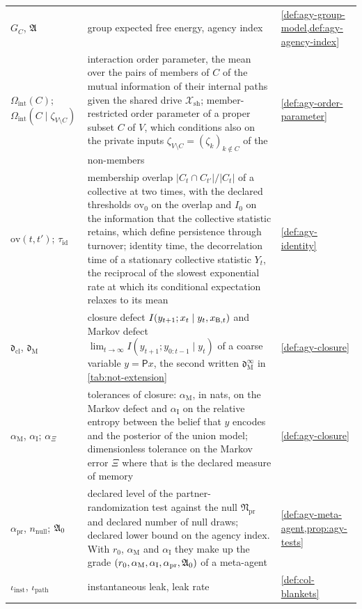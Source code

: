 \begin{longtable}{@{}>{\raggedright\arraybackslash}p{}>{\raggedright\arraybackslash}p{}>{\raggedright\arraybackslash}p{}@{}}
$G_C$, $\mathfrak{A}$ & group expected free energy, agency index & \cref{def:agy-group-model,def:agy-agency-index}\\
$\Omega_{\mathrm{int}}(C)$; $\Omega_{\mathrm{int}}(C\mid\zeta_{V\setminus C})$ & interaction order parameter, the mean over the pairs of members of $C$ of the mutual information of their internal paths given the shared drive $\mathcal X_{\mathrm{sh}}$; member-restricted order parameter of a proper subset $C$ of $V$, which conditions also on the private inputs $\zeta_{V\setminus C}=(\zeta_k)_{k\notin C}$ of the non-members & \cref{def:agy-order-parameter}\\
$\mathrm{ov}(t,t')$; $\tau_{\mathrm{id}}$ & membership overlap $\lvert C_t\cap C_{t'}\rvert/\lvert C_t\rvert$ of a collective at two times, with the declared thresholds $\mathrm{ov}_0$ on the overlap and $I_0$ on the information that the collective statistic retains, which define persistence through turnover; identity time, the decorrelation time of a stationary collective statistic $Y_t$, the reciprocal of the slowest exponential rate at which its conditional expectation relaxes to its mean & \cref{def:agy-identity}\\
$\mathfrak d_{\mathrm{cl}}$, $\mathfrak d_{\mathrm M}$ & closure defect $I(y_{t+1};x_t\mid y_t,x_{\mathsf{B},t})$ and Markov defect $\lim_{t\to\infty}I(y_{t+1};y_{0:t-1}\mid y_t)$ of a coarse variable $y=\mathsf Px$, the second written $\mathfrak d^\infty_{\mathrm M}$ in \cref{tab:not-extension} & \cref{def:agy-closure}\\
$\alpha_{\mathrm M}$, $\alpha_{\mathrm I}$; $\alpha_\Xi$ & tolerances of closure: $\alpha_{\mathrm M}$, in nats, on the Markov defect and $\alpha_{\mathrm I}$ on the relative entropy between the belief that $y$ encodes and the posterior of the union model; dimensionless tolerance on the Markov error $\Xi$ where that is the declared measure of memory & \cref{def:agy-closure}\\
$\alpha_{\mathrm{pr}}$, $n_{\mathrm{null}}$; $\mathfrak{A}_0$ & declared level of the partner-randomization test against the null $\mathfrak N_{\mathrm{pr}}$ and declared number of null draws; declared lower bound on the agency index. With $r_0$, $\alpha_{\mathrm M}$ and $\alpha_{\mathrm I}$ they make up the grade $(r_0,\alpha_{\mathrm M},\alpha_{\mathrm I},\alpha_{\mathrm{pr}},\mathfrak{A}_0)$ of a meta-agent & \cref{def:agy-meta-agent,prop:agy-tests}\\
$\iota_{\mathrm{inst}}$, $\iota_{\mathrm{path}}$ & instantaneous leak, leak rate & \cref{def:col-blankets}\\
\end{longtable}
\endgroup

